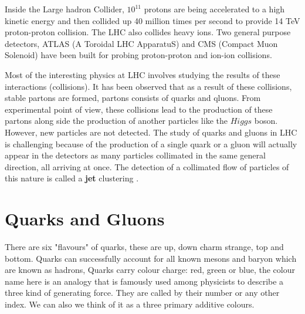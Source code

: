 Inside the Large hadron Collider, $10^{11}$ protons are being accelerated to a high kinetic energy and then collided up 40 million times per second to provide 14 \si{TeV} proton-proton collision.
The LHC also collides heavy ions. Two general purpose detectors, ATLAS (A Toroidal LHC ApparatuS) \cite{Aad:2008zzm} and CMS (Compact Muon Solenoid) \cite{1748-0221-3-08-S08004} have been built for probing proton-proton and ion-ion collisions.
 
Most of the interesting physics at LHC involves studying the results of these interactions (collisions). It has been observed that as a result of these collisions, stable partons are formed, partons consists of quarks and qluons.
From experimental point of view, these collisions lead to the production of these partons along side
the production of another
particles like the $Higgs$ boson.
However, new particles are not detected.
The study of quarks and gluons in LHC is challenging because of the production of a single quark or a gluon will actually appear in the detectors as many particles collimated in the same general direction, all arriving at once. The detection of a collimated flow of particles of this nature is called a \textbf{jet} clustering\label{Lhc} \citep{Ellis:2007ib}.



\section{Quarks and Gluons}

There are six "flavours" of quarks, these are up, down charm strange, top and bottom.
Quarks can successfully account for all known mesons and baryon which are known as hadrons,
%
%
Quarks carry colour charge: red, green or blue, the colour name here is an analogy  that is famously used among physicists to describe a three kind
of generating force.
They are called by their number or any other index.
We can also we think of it as a three primary additive colours.

